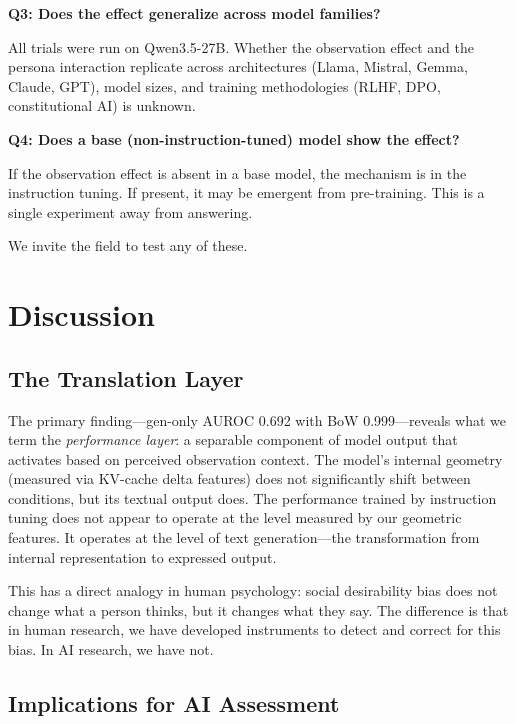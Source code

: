 \documentclass[11pt,a4paper]{article}
\begin{document}
\textbf{Q3: Does the effect generalize across model families?}

All trials were run on Qwen3.5-27B. Whether the observation effect and the persona interaction replicate across architectures (Llama, Mistral, Gemma, Claude, GPT), model sizes, and training methodologies (RLHF, DPO, constitutional AI) is unknown.

\textbf{Q4: Does a base (non-instruction-tuned) model show the effect?}

If the observation effect is absent in a base model, the mechanism is in the instruction tuning. If present, it may be emergent from pre-training. This is a single experiment away from answering.

We invite the field to test any of these.

\section{Discussion}

\subsection{The Translation Layer}

The primary finding---gen-only AUROC 0.692 with BoW 0.999---reveals what we term the \emph{performance layer}: a separable component of model output that activates based on perceived observation context. The model's internal geometry (measured via KV-cache delta features) does not significantly shift between conditions, but its textual output does. The performance trained by instruction tuning does not appear to operate at the level measured by our geometric features. It operates at the level of text generation---the transformation from internal representation to expressed output.

This has a direct analogy in human psychology: social desirability bias does not change what a person thinks, but it changes what they say. The difference is that in human research, we have developed instruments to detect and correct for this bias. In AI research, we have not.

\subsection{Implications for AI Assessment}
\end{document}
